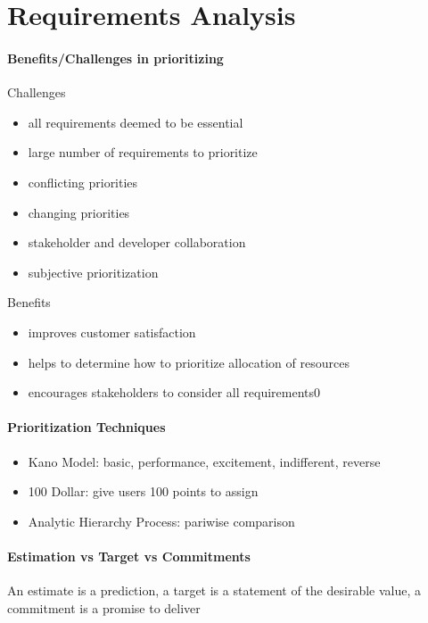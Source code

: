 \documentclass[12pt]{article}
\begin{document}
\section*{Requirements Analysis}
\label{sec:requirements_analysis}
\paragraph{Benefits/Challenges in prioritizing} 
\label{par:genefites_challenges_in_prioritizing}
Challenges
\begin{itemize}
	\item all requirements deemed to be essential
	\item large number of requirements to prioritize
	\item conflicting priorities
	\item changing priorities
	\item stakeholder and developer collaboration
	\item subjective prioritization
\end{itemize}
Benefits
\begin{itemize}
	\item improves customer satisfaction
	\item helps to determine how to prioritize allocation of resources
	\item encourages stakeholders to consider all requirements0
\end{itemize}


\paragraph{Prioritization Techniques} 
\label{par:prioritization_techniques}
\begin{itemize}
	\item Kano Model: basic, performance, excitement, indifferent, reverse
	\item 100 Dollar: give users 100 points to assign
	\item Analytic Hierarchy Process: pariwise comparison
\end{itemize}


\paragraph{Estimation vs Target vs Commitments} 
\label{par:estimation_vs_target_vs_commitments}
An estimate is a prediction, a target is a statement of the desirable value, a commitment is a promise to deliver
\end{document}
